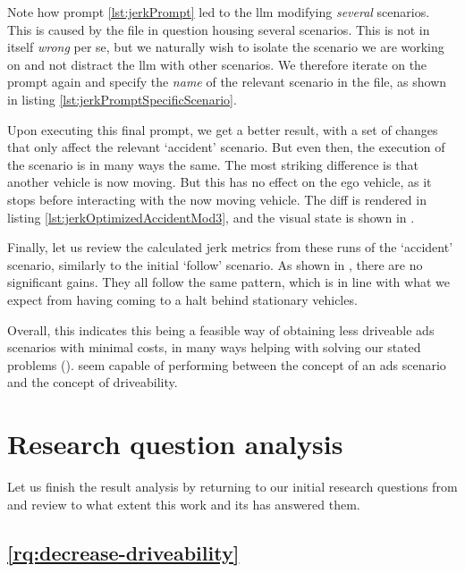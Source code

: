 Note how prompt \ref{lst:jerkPrompt} led to the \acrshort{llm} modifying \emph{several} scenarios.
This is caused by the file in question housing several scenarios. This is not in itself \emph{wrong}
per se, but we naturally wish to isolate the scenario we are working on and not distract the
\acrshort{llm} with other scenarios. We therefore iterate on the prompt again and specify the
\emph{name} of the relevant scenario in the file, as shown in listing
\ref{lst:jerkPromptSpecificScenario}.

Upon executing this final prompt, we get a better result, with a set of changes that only affect the
relevant `accident' scenario. But even then, the execution of the scenario is in many ways the same.
The most striking difference is that another vehicle is now moving. But this has no effect on the
ego vehicle, as it stops before interacting with the now moving vehicle. The diff is rendered in
listing \ref{lst:jerkOptimizedAccidentMod3}, and the visual state is shown in
.

Finally, let us review the calculated jerk metrics from these runs of the `accident' scenario,
similarly to the initial `follow' scenario. As shown in , there are
no significant gains. They all follow the same pattern, which is in line with what we expect from
having coming to a halt behind stationary vehicles.

Overall, this indicates this being a feasible way of obtaining less driveable
\acrshort{ads} scenarios with minimal costs, in many ways helping with solving
our stated problems ().  seem
capable of performing  between the concept of an
\acrshort{ads} scenario and the concept of driveability.

\section{Research question analysis}

Let us finish the result analysis by returning to our initial research questions
from  and review to what extent this work and its
 has answered them.

\subsection{\ref{rq:decrease-driveability}}

